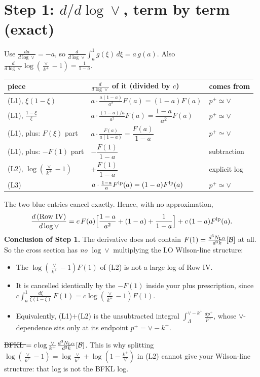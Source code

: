 \documentclass[10pt]{article}
\numberwithin{equation}{section}
\newcommand{\NLO}[1]{\frac{d^3N_{#1}}{d^3k}}
\newcommand{\new}[1]{{\color{blue}#1}}
\newcommand{\old}[1]{{\color{red}\sout{#1}}}
\begin{document}
\section{Step 1: $d/d\log\vee$, term by term (exact)}
Use $\frac{da}{d\log\vee}=-a$, so $\frac{d}{d\log\vee}\int_a^{1}g(\xi)\,d\xi=a\,g(a)$. Also $\frac{d}{d\log\vee}\log(\frac{\vee}{k^+}-1)=\frac{1}{1-a}$.
\begin{center}
\renewcommand{\arraystretch}{1.6}
\begin{tabular}{@{}lll@{}}\toprule
piece & $\frac{d}{d\log\vee}$ of it (divided by $c$) & comes from\\\midrule
(L1), $\xi(1-\xi)$ & $a\cdot\frac{a(1-a)}{a^2}F(a)=(1-a)F(a)$ & $p^+\simeq\vee$\\
(L1), $\frac{1-\xi}{\xi}$ & $a\cdot\frac{(1-a)/a}{a^2}F(a)=\dfrac{1-a}{a^2}F(a)$ & $p^+\simeq\vee$\\
(L1), plus: $F(\xi)$ part & $a\cdot\frac{F(a)}{a(1-a)}=\dfrac{F(a)}{1-a}$ & $p^+\simeq\vee$\\
(L1), plus: $-F(1)$ part & \new{$-\dfrac{F(1)}{1-a}$} & subtraction\\
(L2), $\log(\frac{\vee}{k^+}-1)$ & \new{$+\dfrac{F(1)}{1-a}$} & explicit log\\
(L3) & $a\cdot\frac{1-a}{a}F^{\rm lp}(a)=(1-a)F^{\rm lp}(a)$ & $p^+\simeq\vee$\\\bottomrule
\end{tabular}
\end{center}
The two blue entries cancel exactly. Hence, with no approximation,
\begin{equation}
\frac{d\,(\text{Row IV})}{d\log\vee}=c\,F(a)\Big[\frac{1-a}{a^2}+(1-a)+\frac{1}{1-a}\Big]+c\,(1-a)F^{\rm lp}(a).\label{eq:exact}
\end{equation}
\textbf{Conclusion of Step 1.} The derivative does not contain $F(1)=\NLO{\rm LO}[\mathcal B]$ at all. So the cross section has \emph{no} $\log\vee$ multiplying the LO Wilson-line structure:
\begin{itemize}
\item The $\log(\frac{\vee}{k^+}-1)F(1)$ of (L2) is not a large log of Row IV.
\item It is cancelled identically by the $-F(1)$ inside your plus prescription, since $c\int_a^1\frac{d\xi}{\xi(1-\xi)}\,F(1)=c\log(\frac{\vee}{k^+}-1)F(1)$.
\item Equivalently, (L1)$+$(L2) is the unsubtracted integral $\int_\Lambda^{\vee-k^+}\frac{dp^+}{p^+}$, whose $\vee$-dependence sits only at its endpoint $p^+=\vee-k^+$.
\end{itemize}
\old{BFKL $=c\log\frac{\vee}{k^+}\NLO{\rm LO}[\mathcal B]$}. This is why splitting $\log(\frac{\vee}{k^+}-1)=\log\frac{\vee}{k^+}+\log(1-\frac{k^+}{\vee})$ in (L2) cannot give your Wilson-line structure: that log is not the BFKL log.
\end{document}
